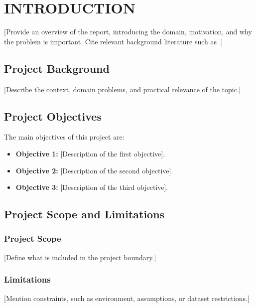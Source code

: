 \chapter{INTRODUCTION}
\label{chap:introduction}

[Provide an overview of the report, introducing the domain, motivation, and why the problem is important. Cite relevant background literature such as \cite{sample_book, sample_article}.]

\section{Project Background}
\label{sec:background}

[Describe the context, domain problems, and practical relevance of the topic.]

\section{Project Objectives}
\label{sec:objectives}

The main objectives of this project are:
\begin{itemize}
    \item \textbf{Objective 1:} [Description of the first objective].
    \item \textbf{Objective 2:} [Description of the second objective].
    \item \textbf{Objective 3:} [Description of the third objective].
\end{itemize}

\section{Project Scope and Limitations}
\label{sec:scope}

\subsection{Project Scope}
[Define what is included in the project boundary.]

\subsection{Limitations}
[Mention constraints, such as environment, assumptions, or dataset restrictions.]

